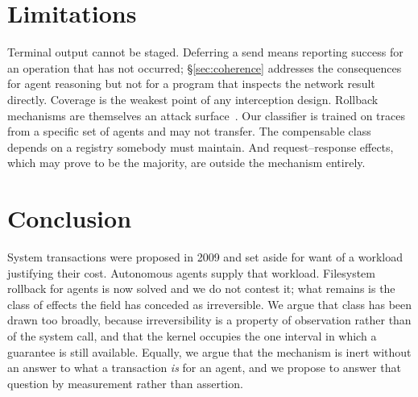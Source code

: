 \documentclass[10pt,twocolumn]{article}
\begin{document}
\section{Limitations}

Terminal output cannot be staged. Deferring a send means reporting success for
an operation that has not occurred; \S\ref{sec:coherence} addresses the
consequences for agent reasoning but not for a program that inspects the network
result directly. Coverage is the weakest point of any interception design.
Rollback mechanisms are themselves an attack surface~\cite{acrfence2026}. Our
classifier is trained on traces from a specific set of agents and may not
transfer. The compensable class depends on a registry somebody must maintain.
And request--response effects, which may prove to be the majority, are outside
the mechanism entirely.

\section{Conclusion}

System transactions were proposed in 2009 and set aside for want of a workload
justifying their cost. Autonomous agents supply that workload. Filesystem
rollback for agents is now solved and we do not contest it; what remains is the
class of effects the field has conceded as irreversible. We argue that class has
been drawn too broadly, because irreversibility is a property of observation
rather than of the system call, and that the kernel occupies the one interval in
which a guarantee is still available. Equally, we argue that the mechanism is
inert without an answer to what a transaction \emph{is} for an agent, and we
propose to answer that question by measurement rather than assertion.



\end{document}

